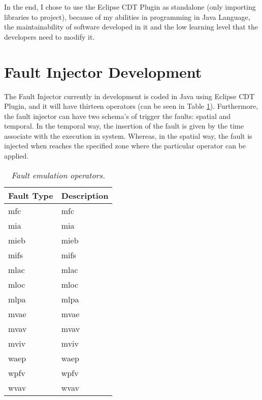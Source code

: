 In the end, I chose to use the Eclipse CDT Plugin as standalone (only importing libraries to project), because of my abilities in programming in Java Language, the maintainability of software developed in it and the low learning level that the developers need to modify it.\\

\clearpage
\section{Fault Injector Development}

The Fault Injector currently in development is coded in Java using Eclipse CDT Plugin, and it will have thirteen operators (can be seen in Table \ref{tab:faultEmulationOperators})\cite{duraes2005thesis}. Furthermore, the fault injector can have two schema's of trigger the faults: spatial and temporal. In the temporal way, the insertion of the fault is given by the time associate with the execution in system. Whereas, in the spatial way, the fault is injected when reaches the specified zone where the particular operator can be applied.

\begin{table}[!ht]
\begin{tabular}{|l|p{12cm}|}
\hline
\textbf{Fault Type}		& \multicolumn{1}{c|}{\textbf{Description}}		\\ \hline \hline
\acs{mfc}        				& \Acl{mfc}  									\\ \hline
\acs{mia}        				& \Acl{mia}  									\\ \hline
\acs{mieb}       				& \Acl{mieb} 									\\ \hline
\acs{mifs}       				& \Acl{mifs} 									\\ \hline
\acs{mlac}       				& \Acl{mlac} 									\\ \hline
\acs{mloc}       				& \Acl{mloc} 									\\ \hline
\acs{mlpa}       				& \Acl{mlpa} 									\\ \hline
\acs{mvae}       				& \Acl{mvae} 									\\ \hline
\acs{mvav}       				& \Acl{mvav} 									\\ \hline
\acs{mviv}       				& \Acl{mviv} 									\\ \hline
\acs{waep}       				& \Acl{waep} 									\\ \hline
\acs{wpfv}       				& \Acl{wpfv} 									\\ \hline
\acs{wvav}       				& \Acl{wvav} 									\\ \hline
\end{tabular}
\caption{\small \sl Fault emulation operators.\label{tab:faultEmulationOperators}}
\end{table}

